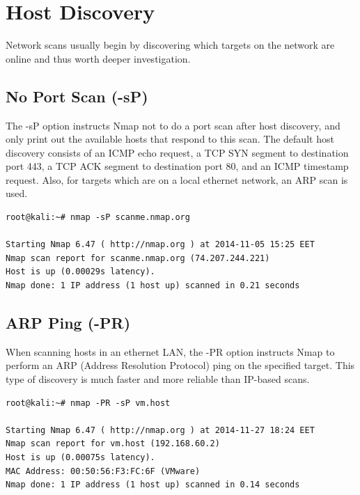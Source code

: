 \documentclass[a4paper,oneside,12pt]{book}
\begin{document}
\chapter*{Host Discovery}
 

Network scans usually begin by discovering which targets on the network are online and thus worth deeper investigation.

\section{No Port Scan (-sP)}

The -sP option instructs Nmap not to do a port scan after host discovery, and only print out the available hosts that respond to this scan. The default host discovery consists of an ICMP echo request, a TCP SYN segment to destination port 443, a TCP ACK segment to destination port 80, and an ICMP timestamp request. Also, for targets which are on a local ethernet network, an ARP scan is used.

\begin{lstlisting}[title=A sample Nmap scan using the No Port Scan option]
root@kali:~# nmap -sP scanme.nmap.org

Starting Nmap 6.47 ( http://nmap.org ) at 2014-11-05 15:25 EET
Nmap scan report for scanme.nmap.org (74.207.244.221)
Host is up (0.00029s latency).
Nmap done: 1 IP address (1 host up) scanned in 0.21 seconds
\end{lstlisting}

\section{ARP Ping (-PR)}

When scanning hosts in an ethernet LAN, the -PR option instructs Nmap to perform an ARP (Address Resolution Protocol) ping on the specified target. This type of discovery is much faster and more reliable than IP-based scans.

\begin{lstlisting}[title=A sample Nmap scan using the ARP Ping option]
root@kali:~# nmap -PR -sP vm.host

Starting Nmap 6.47 ( http://nmap.org ) at 2014-11-27 18:24 EET
Nmap scan report for vm.host (192.168.60.2)
Host is up (0.00075s latency).
MAC Address: 00:50:56:F3:FC:6F (VMware)
Nmap done: 1 IP address (1 host up) scanned in 0.14 seconds
\end{lstlisting}
\end{document}
